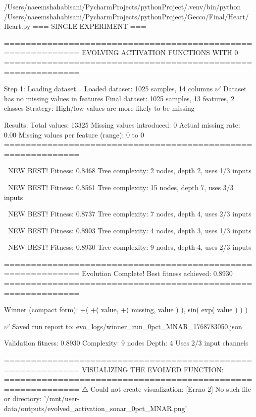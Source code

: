 /Users/naeemshahabisani/PycharmProjects/pythonProject/.venv/bin/python /Users/naeemshahabisani/PycharmProjects/pythonProject/Gecco/Final/Heart/Heart.py
=== SINGLE EXPERIMENT ===

============================================================
EVOLVING ACTIVATION FUNCTIONS
WITH 0%
============================================================

Step 1: Loading dataset...
Loaded dataset: 1025 samples, 14 columns
✅ Dataset has no missing values in features
Final dataset: 1025 samples, 13 features, 2 classes
Strategy: High/low values are more likely to be missing

Results:
  Total values: 13325
  Missing values introduced: 0
  Actual missing rate: 0.00%
  Missing values per feature (range): 0 to 0
============================================================


🎯 NEW BEST! Fitness: 0.8468
Tree complexity: 2 nodes, depth 2, uses 1/3 inputs

🎯 NEW BEST! Fitness: 0.8561
Tree complexity: 15 nodes, depth 7, uses 3/3 inputs

🎯 NEW BEST! Fitness: 0.8737
Tree complexity: 7 nodes, depth 4, uses 2/3 inputs

🎯 NEW BEST! Fitness: 0.8903
Tree complexity: 4 nodes, depth 3, uses 1/3 inputs

🎯 NEW BEST! Fitness: 0.8930
Tree complexity: 9 nodes, depth 4, uses 2/3 inputs

============================================================
Evolution Complete!
Best fitness achieved: 0.8930
============================================================

Winner (compact form):
 +(
  +(
    value,
    +(
      missing,
      value
    )
  ),
  sin(
    exp(
      value
    )
  )
)

✅ Saved run report to: evo_logs/winner_run_0pct_MNAR_1768783050.json

Validation fitness: 0.8930
Complexity: 9 nodes
Depth: 4
Uses 2/3 input channels

============================================================
VISUALIZING THE EVOLVED FUNCTION:
============================================================
⚠️ Could not create visualization: [Errno 2] No such file or directory: '/mnt/user-data/outputs/evolved_activation_sonar_0pct_MNAR.png'

